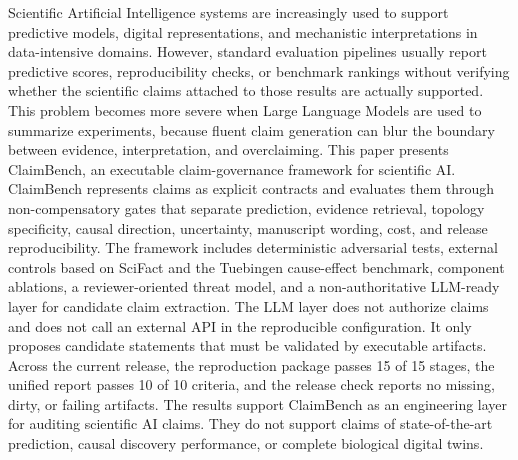 Scientific Artificial Intelligence systems are increasingly used to support predictive models, digital representations, and mechanistic interpretations in data-intensive domains. However, standard evaluation pipelines usually report predictive scores, reproducibility checks, or benchmark rankings without verifying whether the scientific claims attached to those results are actually supported. This problem becomes more severe when Large Language Models are used to summarize experiments, because fluent claim generation can blur the boundary between evidence, interpretation, and overclaiming. This paper presents ClaimBench, an executable claim-governance framework for scientific AI. ClaimBench represents claims as explicit contracts and evaluates them through non-compensatory gates that separate prediction, evidence retrieval, topology specificity, causal direction, uncertainty, manuscript wording, cost, and release reproducibility. The framework includes deterministic adversarial tests, external controls based on SciFact and the Tuebingen cause-effect benchmark, component ablations, a reviewer-oriented threat model, and a non-authoritative LLM-ready layer for candidate claim extraction. The LLM layer does not authorize claims and does not call an external API in the reproducible configuration. It only proposes candidate statements that must be validated by executable artifacts. Across the current release, the reproduction package passes 15 of 15 stages, the unified report passes 10 of 10 criteria, and the release check reports no missing, dirty, or failing artifacts. The results support ClaimBench as an engineering layer for auditing scientific AI claims. They do not support claims of state-of-the-art prediction, causal discovery performance, or complete biological digital twins.
